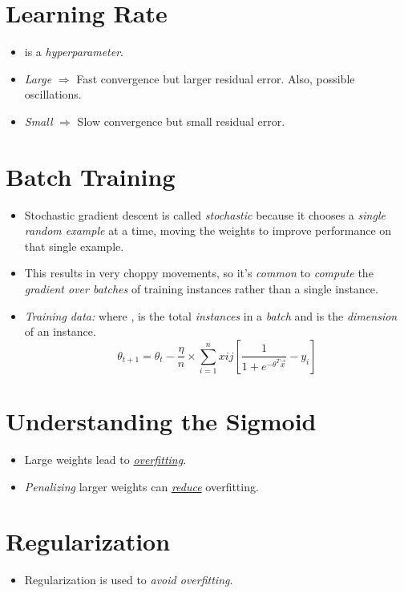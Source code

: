 \documentclass[
	number={4},
	title={Logistic Regression}
]{cs584notes}
\begin{document}
\section{Learning Rate}\label{sec:learning-rate}
\begin{itemize}
	\item \data{$\eta$} is a \emph{hyperparameter}.
	\item \emph{Large} \data{$\eta$} $\Rightarrow$ Fast convergence but larger residual error.
	Also, possible oscillations.
	\item \emph{Small} \data{$\eta$} $\Rightarrow$ Slow convergence but small residual error.
\end{itemize}


\section{Batch Training}\label{sec:batch-training}
\begin{itemize}
	\item Stochastic gradient descent is called \emph{stochastic} because it chooses a \emph{single random example} at a time, moving the weights to improve performance on that single example.
	\item This results in very choppy movements, so it's \emph{common} to \emph{compute} the \emph{gradient over batches} of training instances rather than a single instance.
	\item \emph{Training data: }  where ,  is the total \emph{instances} in a \emph{batch} and  is the \emph{dimension} of an instance.
	\begin{equation}
		\theta_{t+1} = \theta_{t} - \frac{\eta}{n} \times \sum_{i=1}^{n} xij \left[ \frac{1}{1 + e^{-\theta^{T}\vec{x}}} - y_{i} \right]
		\label{eq:batch-training}
	\end{equation}
\end{itemize}

\section{Understanding the Sigmoid}\label{sec:understanding-the-sigmoid}
\begin{itemize}
	\item Large weights lead to \hyperref[sec:fitting]{\emph{overfitting}}.
	\item \emph{Penalizing} larger weights can \hyperref[subsec:resolving-overfitting]{\emph{reduce}} overfitting.
\end{itemize}

\section{Regularization}\label{sec:regularization}
\begin{itemize}
	\item Regularization is used to \emph{avoid overfitting}.
\end{itemize}
\end{document}
